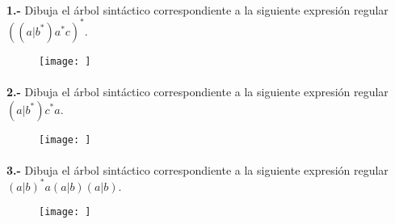 \documentclass[11pt,a4paper]{report}
\begin{document}
\paragraph{}

\paragraph{}
\textbf{1.-} Dibuja el árbol sintáctico correspondiente a la siguiente expresión regular $ ((a|b^*)a^*c)^* $. 
\begin{figure}[ht!]
\centering
\texttt{[image: ]}
\end{figure}\paragraph{}
\textbf{2.-} Dibuja el árbol sintáctico correspondiente a la siguiente expresión regular $ (a|b^*)c^*a $. 
\begin{figure}[ht!]
\centering
\texttt{[image: ]}
\end{figure}\paragraph{}
\textbf{3.-} Dibuja el árbol sintáctico correspondiente a la siguiente expresión regular $ (a|b)^*a(a|b)(a|b) $. 
\begin{figure}[ht!]
\centering
\texttt{[image: ]}
\end{figure}
\end{document}
